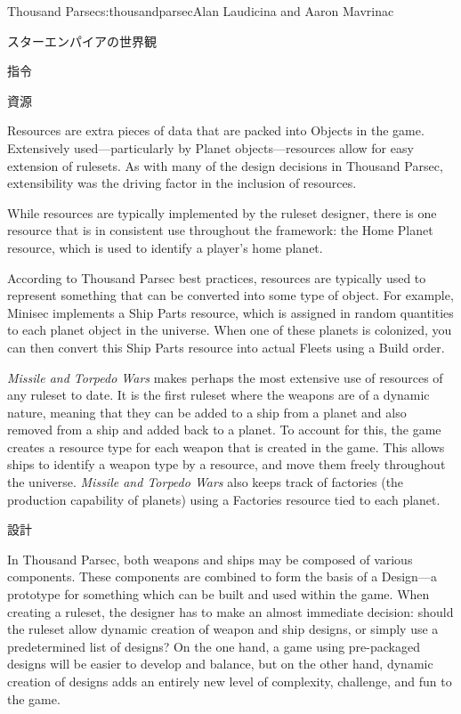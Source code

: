 \begin{aosachapter}{Thousand Parsec}{s:thousandparsec}{Alan Laudicina and Aaron Mavrinac}
\begin{aosasect1}{スターエンパイアの世界観}
\begin{aosasect2}{指令}
\end{aosasect2}

\begin{aosasect2}{資源}

Resources are extra pieces of data that are packed into Objects in the
game. Extensively used---particularly by Planet objects---resources
allow for easy extension of rulesets. As with many of the design
decisions in Thousand Parsec, extensibility was the driving factor in
the inclusion of resources.

While resources are typically implemented by the ruleset designer,
there is one resource that is in consistent use throughout the
framework: the Home Planet resource, which is used to identify a
player's home planet.

According to Thousand Parsec best practices, resources are typically
used to represent something that can be converted into some type of
object. For example, Minisec implements a Ship Parts resource, which
is assigned in random quantities to each planet object in the
universe.  When one of these planets is colonized, you can then
convert this Ship Parts resource into actual Fleets using a Build
order.

\emph{Missile and Torpedo Wars} makes perhaps the most extensive use
of resources of any ruleset to date. It is the first ruleset where the
weapons are of a dynamic nature, meaning that they can be added to a
ship from a planet and also removed from a ship and added back to a
planet. To account for this, the game creates a resource type for each
weapon that is created in the game. This allows ships to identify a
weapon type by a resource, and move them freely throughout the
universe. \emph{Missile and Torpedo Wars} also keeps track of
factories (the production capability of planets) using a Factories
resource tied to each planet.

\end{aosasect2}

\begin{aosasect2}{設計}

In Thousand Parsec, both weapons and ships may be composed of various
components. These components are combined to form the basis of a
Design---a prototype for something which can be built and used within
the game. When creating a ruleset, the designer has to make an almost
immediate decision: should the ruleset allow dynamic creation of
weapon and ship designs, or simply use a predetermined list of
designs? On the one hand, a game using pre-packaged designs will be
easier to develop and balance, but on the other hand, dynamic creation
of designs adds an entirely new level of complexity, challenge, and
fun to the game.


\end{aosasect2}
\end{aosasect1}
\end{aosachapter}
